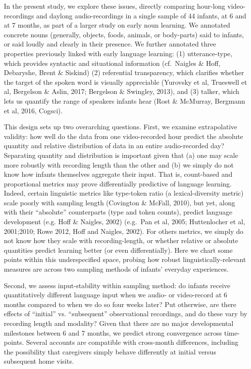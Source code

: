 \documentclass[man]{apa6}
\theoremstyle{definition}
\theoremstyle{definition}
\theoremstyle{definition}
\theoremstyle{remark}
\begin{document}
In the present study, we explore these issues, directly comparing
hour-long video-recordings and daylong audio-recordings in a single
sample of 44 infants, at 6 and at 7 months, as part of a larger study on
early noun learning. We annotated concrete nouns (generally, objects,
foods, animals, or body-parts) said to infants, or said loudly and
clearly in their presence. We further annotated three properties
previously linked with early language learning: (1) utterance-type,
which provides syntactic and situational information (cf.~Naigles \&
Hoff, Debaryshe, Brent \& Siskind) (2) referential transparency, which
clarifies whether the target of the spoken word is visually appreciable
(Yurovsky et al, Trueswell et al, Bergelson \& Aslin, 2017; Bergelson \&
Swingley, 2013), and (3) talker, which lets us quantify the range of
speakers infants hear (Rost \& McMurray, Bergmann et al, 2016, Cogsci).

This design sets up two overarching questions. First, we examine
extrapolative validity: how well do the data from one video-recorded
hour predict the absolute quantity and relative distribution of data in
an entire audio-recorded day? Separating quantity and distribution is
important given that (a) one may scale more robustly with recording
length than the other and (b) we simply do not know how infants
themselves aggregate their input. That is, count-based and proportional
metrics may prove differentially predictive of language learning.
Indeed, certain linguistic metrics like type-token ratio (a
lexical-diversity metric) scale poorly with sampling length (Covington
\& McFall, 2010), but yet, along with their \enquote{absolute}
counterparts (type and token counts), predict language development (e.g.
Hoff \& Naigles, 2002) (e.g.~Pan et al, 2005; Huttenlocher et al,
2001;2010; Rowe 2012, Hoff and Naigles, 2002). For others metrics, we
simply do not know how they scale with recording-length, or whether
relative or absolute quantities predict learning better (or even
differentially). Here we chart some points within this underspecified
space, probing how robust linguistically-relevant measures are across
two sampling methods of infants' everyday experiences.

Second, we assess input-stability within sampling method: do infants
receive quantitatively different language input when we audio- or
video-record at 6 months compared to when we do so four weeks later? Put
otherwise, are there effects of \enquote{initial} vs.
\enquote{subsequent} observational recordings, and do these vary by
recording length and modality? Given that there are no major
developmental milestones between 6 and 7 months, we predict strong
convergence across time-points. Several accounts are compatible with
cross-month differences, including the possibility that caregivers
simply behave differently at initial versus subsequent home visits.
\end{document}
